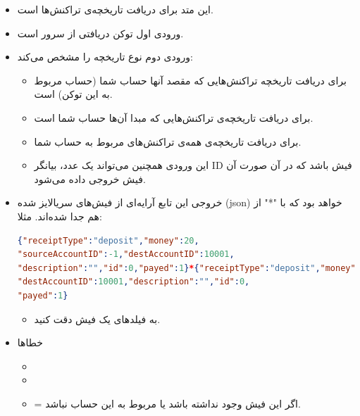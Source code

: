 \documentclass[]{article}
\begin{document}
\begin{itemize}

\item
این متد برای دریافت تاریخچه‌ی تراکنش‌ها است.
\item
\textcolor{CustomColor}{ورودی} اول توکن دریافتی از سرور است.
\item
\textcolor{CustomColor}{ورودی} دوم نوع تاریخچه را مشخص می‌کند:

\begin{itemize}
\item
{}  برای دریافت تاریخچه تراکنش‌هایی که مقصد آنها حساب شما (حساب مربوط به این توکن) است.
\item
{}  برای دریافت تاریخچه‌ی تراکنش‌هایی که مبدا آن‌ها حساب شما است.
\item
{}  برای دریافت تاریخچه‌ی همه‌ی تراکنش‌های مربوط به حساب شما.
\item
این ورودی همچنین می‌تواند یک عدد، بیانگر ID فیش باشد که در آن صورت آن فیش خروجی داده می‌شود.
\end{itemize}

\item
\textcolor{CustomColor}{خروجی} این تابع آرایه‌ای از فیش‌های سریالایز شده (json) خواهد بود که با "*" از هم جدا شده‌اند. مثلا:




\begin{latin}

\begin{lstlisting}[language = json , numbers = none]
{"receiptType":"deposit","money":20,
"sourceAccountID":-1,"destAccountID":10001,
"description":"","id":0,"payed":1}*{"receiptType":"deposit","money":2000,"sourceAccountID":-1,
"destAccountID":10001,"description":"","id":0,
"payed":1}
\end{lstlisting}

\end{latin}

\begin{itemize}[label = $\star$]

\item
به فیلدهای یک فیش دقت کنید.	

\end{itemize}

\item
\textcolor{CustomColor}{خطاها}
\begin{itemize}
\item
{}

\item
{}

\item
{} = اگر این فیش وجود نداشته باشد یا مربوط به این حساب نباشد.


\end{itemize}

\end{itemize}
\end{document}
